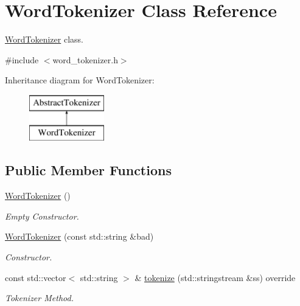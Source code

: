 \hypertarget{class_word_tokenizer}{}\section{Word\+Tokenizer Class Reference}
\label{class_word_tokenizer}


\hyperlink{class_word_tokenizer}{Word\+Tokenizer} class.  




{\ttfamily \#include $<$word\+\_\+tokenizer.\+h$>$}

Inheritance diagram for Word\+Tokenizer\+:\begin{figure}[H]
\begin{center}
\leavevmode
\includegraphics[height=2.000000cm]{class_word_tokenizer}
\end{center}
\end{figure}
\subsection*{Public Member Functions}
\begin{DoxyCompactItemize}
\item 
\mbox{\label{class_word_tokenizer_a78cfc8455e2b0d99ae070a9d9ef647c8}} 
\hyperlink{class_word_tokenizer_a78cfc8455e2b0d99ae070a9d9ef647c8}{Word\+Tokenizer} ()
\begin{DoxyCompactList}\small\item\em Empty Constructor. \end{DoxyCompactList}\item 
\hyperlink{class_word_tokenizer_ad118d5de7f4e954b691f95aa5f8d514d}{Word\+Tokenizer} (const std\+::string \&bad)
\begin{DoxyCompactList}\small\item\em Constructor. \end{DoxyCompactList}\item 
const std\+::vector$<$ std\+::string $>$ \& \hyperlink{class_word_tokenizer_a1148e1e01de56a7529a39a81a712e04c}{tokenize} (std\+::stringstream \&ss) override
\begin{DoxyCompactList}\small\item\em Tokenizer Method. \end{DoxyCompactList}\end{DoxyCompactItemize}
